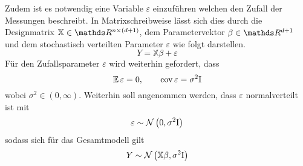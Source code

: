 		Zudem ist es notwendig eine Variable $\varepsilon$ einzuführen welchen den Zufall der Messungen beschreibt.
	    In Matrixschreibweise lässt sich dies durch die Designmatrix $\mathbb{X} \in \SR^{n \times (d+1)}$, dem Parametervektor $\beta \in \SR^{d+1}$ und dem stochastisch  verteilten Parameter $\varepsilon$ wie folgt darstellen.
		\[
			Y = \mathbb{X}\beta + \varepsilon
		\]
		Für den Zufallsparameter $\varepsilon$ wird weiterhin gefordert, dass
		\[
			\operatorname{\mathbb{E}} \varepsilon = 0, \qquad \operatorname{cov} \varepsilon = \sigma^2 \mathrm{I}
		\]
		wobei $\sigma^2 \in (0,\infty)$.
		Weiterhin soll angenommen werden, dass $\varepsilon$ normalverteilt ist mit
	    \[
			\varepsilon \sim \mathcal{N} \left( 0,\sigma^2\mathrm{I} \right)
		\]
	    sodass sich für das Gesamtmodell gilt
		\[
			Y \sim \mathcal{N} \left( \mathbb{X}\beta,\sigma^2 \mathrm{I} \right)
		\]
      


